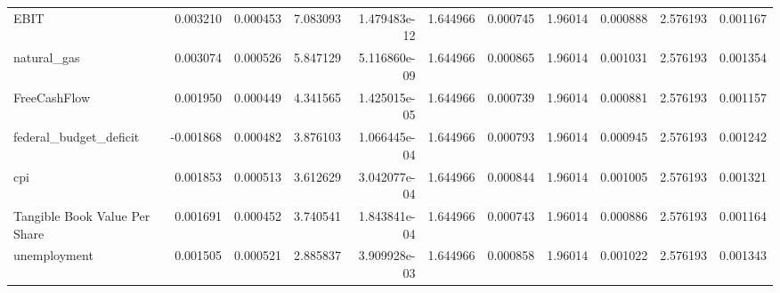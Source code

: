 \documentclass[12pt,a4paper,english]{article}
\begin{document}
{{\begin{tabular}{@{}lrrrrrrrrrr@{}}
			EBIT                           & 0.003210                 & 0.000453                    & 7.083093                  & 1.479483e-12                             & 1.644966                      & 0.000745                      & 1.96014                      & 0.000888                     & 2.576193                     & 0.001167                     \\
			natural\_gas                   & 0.003074                 & 0.000526                    & 5.847129                  & 5.116860e-09                             & 1.644966                      & 0.000865                      & 1.96014                      & 0.001031                     & 2.576193                     & 0.001354                     \\
			FreeCashFlow                   & 0.001950                 & 0.000449                    & 4.341565                  & 1.425015e-05                             & 1.644966                      & 0.000739                      & 1.96014                      & 0.000881                     & 2.576193                     & 0.001157                     \\
			federal\_budget\_deficit       & -0.001868                & 0.000482                    & 3.876103                  & 1.066445e-04                             & 1.644966                      & 0.000793                      & 1.96014                      & 0.000945                     & 2.576193                     & 0.001242                     \\
			cpi                            & 0.001853                 & 0.000513                    & 3.612629                  & 3.042077e-04                             & 1.644966                      & 0.000844                      & 1.96014                      & 0.001005                     & 2.576193                     & 0.001321                     \\
			Tangible Book Value Per Share  & 0.001691                 & 0.000452                    & 3.740541                  & 1.843841e-04                             & 1.644966                      & 0.000743                      & 1.96014                      & 0.000886                     & 2.576193                     & 0.001164                     \\
			unemployment                   & 0.001505                 & 0.000521                    & 2.885837                  & 3.909928e-03                             & 1.644966                      & 0.000858                      & 1.96014                      & 0.001022                     & 2.576193                     & 0.001343                     \\

\end{tabular}}}
\end{document}
